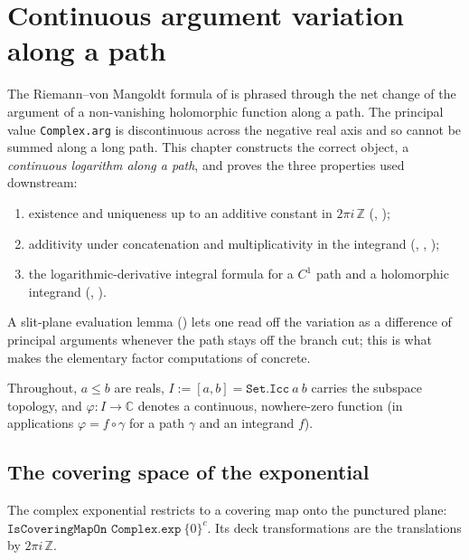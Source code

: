 
\chapter{Continuous argument variation along a path}
\label{cha:arg_variation}

The Riemann--von Mangoldt formula of  is phrased through the
net change of the argument of a non-vanishing holomorphic function along a path.
The principal value \texttt{Complex.arg} is discontinuous across the negative real
axis and so cannot be summed along a long path. This chapter constructs the correct
object, a \emph{continuous logarithm along a path}, and proves the three
properties used downstream:
\begin{enumerate}
  \item existence and uniqueness up to an additive constant in $2\pi i\,\mathbb Z$
        (, );
  \item additivity under concatenation and multiplicativity in the integrand
        (, , );
  \item the logarithmic-derivative integral formula for a $C^1$ path and a
        holomorphic integrand (, ).
\end{enumerate}
A slit-plane evaluation lemma () lets one read off the
variation as a difference of principal arguments whenever the path stays off the
branch cut; this is what makes the elementary factor computations of
 concrete.

Throughout, $a\le b$ are reals, $I:=[a,b]=\texttt{Set.Icc}\ a\ b$ carries the
subspace topology, and $\varphi:I\to\mathbb{C}$ denotes a continuous, nowhere-zero
function (in applications $\varphi = f\circ\gamma$ for a path $\gamma$ and an
integrand $f$).

\section{The covering space of the exponential}
\label{sec:av_covering}

\begin{theorem}
\label{thm:av_covering}
\leanok
The complex exponential restricts to a covering map onto the punctured plane:
$\texttt{IsCoveringMapOn Complex.exp}\ \{0\}^c$. Its deck transformations are the
translations by $2\pi i\,\mathbb{Z}$.
\end{theorem}

